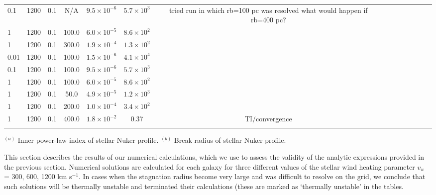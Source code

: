 \documentclass[usenatbib,fleqn]{mn2e}
\begin{document}
\begin{table}
\begin{minipage}{18cm}
\begin{tabular}{lccccccccccccc}
0.1 & 1200 & 0.1 & N/A & $ 9.5 \times 10^{ -6 }$ & $ 5.7 \times 10^{
  3 }$ &  tried run in which rb=100 pc was resolved what would happen if rb=400 pc?\\
1 & 1200 & 0.1 & 100.0 & $ 6.0 \times 10^{ -5 }$ & $ 8.6 \times 10^{ 2 }$ &  \\
1 & 1200 & 0.1 & 300.0 & $ 1.9 \times 10^{ -4 }$ & $ 1.3 \times 10^{
  2 }$ &  \\
0.01 & 1200 & 0.1 & 100.0 & $ 1.5 \times 10^{ -6 }$ & $ 4.1 \times 10^{ 4 }$ &  \\
0.1 & 1200& 0.1 & 100.0 & $ 9.5 \times 10^{ -6 }$ & $ 5.7 \times 10^{ 3 }$ &  \\
1 & 1200 & 0.1 & 100.0 & $ 6.0 \times 10^{ -5 }$ & $ 8.6 \times 10^{ 2 }$ &  \\
1 & 1200 & 0.1 & 50.0 & $ 4.9 \times 10^{ -5 }$ & $ 1.2 \times 10^{ 3 }$ &  \\
1 & 1200 & 0.1 & 200.0 & $ 1.0 \times 10^{ -4 }$ & $ 3.4 \times 10^{ 2 }$ &  \\
1 & 1200 & 0.1 & 400.0 & $ 1.8 \times 10^{ -2 }$ & 0.37 &  TI/convergence\\
\hline
\label{table:models}  
\end{tabular}
$^{(a)}$ Inner power-law index of stellar Nuker profile.  $^{(b)}$ Break radius of stellar Nuker profile.
\end{minipage}
\end{table}



This section describes the results of our numerical calculations,
which we use to assess the validity of the analytic expressions
provided in the previous section.  Numerical solutions are calculated
for each galaxy for three different values of the stellar wind heating
parameter $v_{w}$ = 300, 600, 1200 km s$^{-1}$.  In cases when the stagnation radius become very large and was difficult to resolve on the grid, we conclude that such solutions will be thermally unstable and terminated their calculations (these are marked as `thermally unstable' in the tables.  
\end{document}
